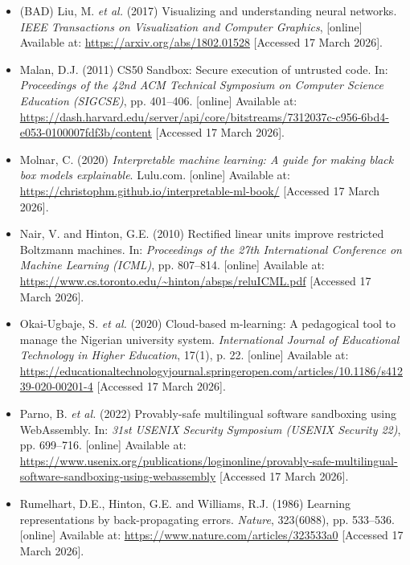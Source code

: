 \documentclass{article}
\begin{document}
\begin{itemize}
\item (BAD) Liu, M. \emph{et al.} (2017) Visualizing and understanding neural networks. \emph{IEEE Transactions on Visualization and Computer Graphics}, [online] Available at: \url{https://arxiv.org/abs/1802.01528} [Accessed 17 March 2026]. %

\item Malan, D.J. (2011) CS50 Sandbox: Secure execution of untrusted code. In: \emph{Proceedings of the 42nd ACM Technical Symposium on Computer Science Education (SIGCSE)}, pp. 401--406. [online] Available at: \url{https://dash.harvard.edu/server/api/core/bitstreams/7312037c-c956-6bd4-e053-0100007fdf3b/content} [Accessed 17 March 2026]. %

\item Molnar, C. (2020) \emph{Interpretable machine learning: A guide for making black box models explainable}. Lulu.com. [online] Available at: \url{https://christophm.github.io/interpretable-ml-book/} [Accessed 17 March 2026]. %

\item Nair, V. and Hinton, G.E. (2010) Rectified linear units improve restricted Boltzmann machines. In: \emph{Proceedings of the 27th International Conference on Machine Learning (ICML)}, pp. 807--814. [online] Available at: \url{https://www.cs.toronto.edu/~hinton/absps/reluICML.pdf} [Accessed 17 March 2026].  %

\item Okai-Ugbaje, S. \emph{et al.} (2020) Cloud-based m-learning: A pedagogical tool to manage the Nigerian university system. \emph{International Journal of Educational Technology in Higher Education}, 17(1), p. 22. [online] Available at: \url{https://educationaltechnologyjournal.springeropen.com/articles/10.1186/s41239-020-00201-4} [Accessed 17 March 2026]. %

\item Parno, B. \emph{et al.} (2022) Provably-safe multilingual software sandboxing using WebAssembly. In: \emph{31st USENIX Security Symposium (USENIX Security 22)}, pp. 699--716. [online] Available at: \url{https://www.usenix.org/publications/loginonline/provably-safe-multilingual-software-sandboxing-using-webassembly} [Accessed 17 March 2026].  %

\item Rumelhart, D.E., Hinton, G.E. and Williams, R.J. (1986) Learning representations by back-propagating errors. \emph{Nature}, 323(6088), pp. 533--536. [online] Available at: \url{https://www.nature.com/articles/323533a0} [Accessed 17 March 2026]. %


\end{itemize}
\end{document}

